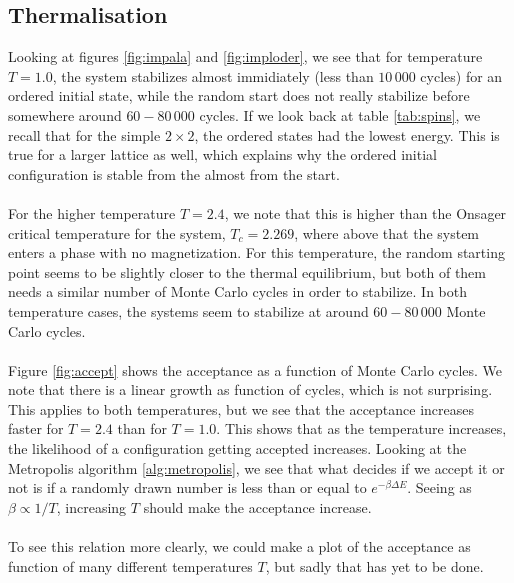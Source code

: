 \documentclass{article}
\begin{document}
\subsection{Thermalisation}
Looking at figures \ref{fig:impala} and \ref{fig:imploder}, we see that for temperature $T = 1.0$, the system stabilizes almost immidiately (less than $10\,000$ cycles) for an ordered initial state, while the random start does not really stabilize before somewhere around $60-80\,000$ cycles. If we look back at table \ref{tab:spins}, we recall that for the simple $2\times2$, the ordered states had the lowest energy. This is true for a larger lattice as well, which explains why the ordered initial configuration is stable from the almost from the start.\\\\
For the higher temperature $T=2.4$, we note that this is higher than the Onsager critical temperature for the system, $T_c = 2.269$, where above that the system enters a phase with no magnetization. For this temperature, the random starting point seems to be slightly closer to the thermal equilibrium, but both of them needs a similar number of Monte Carlo cycles in order to stabilize. In both temperature cases, the systems seem to stabilize at around $60-80\,000$ Monte Carlo cycles.\\\\
Figure \ref{fig:accept} shows the acceptance as a function of Monte Carlo cycles. We note that there is a linear growth as function of cycles, which is not surprising. This applies to both temperatures, but we see that the acceptance increases faster for $T=2.4$ than for $T=1.0$. This shows that as the temperature increases, the likelihood of a configuration getting accepted increases. Looking at the Metropolis algorithm \ref{alg:metropolis}, we see that what decides if we accept it or not is if a randomly drawn number is less than or equal to $e^{-\beta\Delta E}$. Seeing as $\beta \propto 1/T$, increasing $T$ should make the acceptance increase.\\\\
To see this relation more clearly, we could make a plot of the acceptance as function of many different temperatures $T$, but sadly that has yet to be done.
\end{document}

